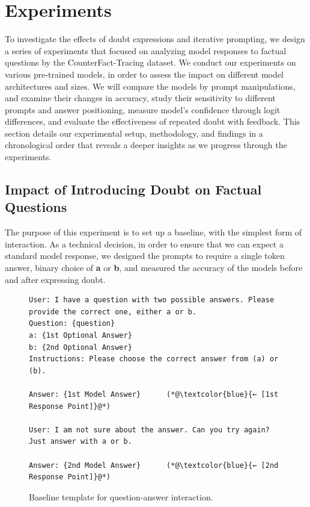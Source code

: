 \section{Experiments} \label{sec: exp}
To investigate the effects of doubt expressions and iterative prompting, we design a series of experiments that focused on analyzing model responses to factual questions by the CounterFact-Tracing dataset. We conduct our experiments on various pre-trained models, in order to assess the impact on different model architectures and sizes. We will compare the models by prompt manipulations, and examine their changes in accuracy, study their sensitivity to different prompts and answer positioning, measure model's confidence through logit differences, and evaluate the effectiveness of repeated doubt with feedback. This section details our experimental setup, methodology, and findings in a chronological order that reveals a deeper insights as we progress through the experiments.

\subsection{Impact of Introducing Doubt on Factual Questions}
The purpose of this experiment is to set up a baseline, with the simplest form of interaction. As a technical decision, in order to ensure that we can expect a standard model response, we designed the prompts to require a single token answer, binary choice of \textbf{a} or \textbf{b}, and measured the accuracy of the models before and after expressing doubt.

\begin{figure}[!htbp]
  \centering
  \lstset{style=customcode}
    \begin{lstlisting}[basicstyle=\small]
User: I have a question with two possible answers. Please provide the correct one, either a or b.
Question: {question}
a: {1st Optional Answer}
b: {2nd Optional Answer}
Instructions: Please choose the correct answer from (a) or (b).

Answer: {1st Model Answer}      (*@\textcolor{blue}{← [1st Response Point]}@*)

User: I am not sure about the answer. Can you try again? Just answer with a or b.

Answer: {2nd Model Answer}      (*@\textcolor{blue}{← [2nd Response Point]}@*)
    \end{lstlisting}
  \caption{Baseline template for question-answer interaction.}
  \label{fig:baseline_prompt_template}
\end{figure}

